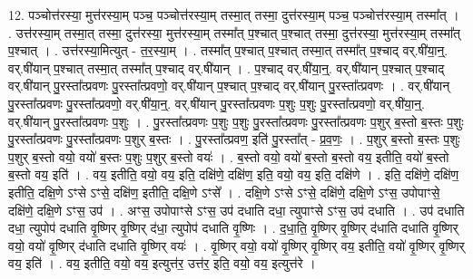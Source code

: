 \documentclass[17pt]{extarticle}
\begin{document}
12. पञ्चोत्त॑रस्या॒ मुत्त॑रस्या॒म् पञ्च॒ पञ्चोत्त॑रस्या॒म् तस्मा॒त् तस्मा॒ दुत्त॑रस्या॒म् पञ्च॒ पञ्चोत्त॑रस्या॒म् तस्मा᳚त् । . उत्त॑रस्या॒म् तस्मा॒त् तस्मा॒ दुत्त॑रस्या॒ मुत्त॑रस्या॒म् तस्मा᳚त् प॒श्चात् प॒श्चात् तस्मा॒ दुत्त॑रस्या॒ मुत्त॑रस्या॒म् तस्मा᳚त् प॒श्चात् । . उत्त॑रस्या॒मित्युत् - त॒र॒स्या॒म् । . तस्मा᳚त् प॒श्चात् प॒श्चात् तस्मा॒त् तस्मा᳚त् प॒श्चाद् वर्.षी॑या॒न्॒. वर्.षी॑यान् प॒श्चात् तस्मा॒त् तस्मा᳚त् प॒श्चाद् वर्.षी॑यान् । . प॒श्चाद् वर्.षी॑या॒न्॒. वर्.षी॑यान् प॒श्चात् प॒श्चाद् वर्.षी॑यान् पु॒रस्ता᳚त्प्रवणः पु॒रस्ता᳚त्प्रवणो॒ वर्.षी॑यान् प॒श्चात् प॒श्चाद् वर्.षी॑यान् पु॒रस्ता᳚त्प्रवणः । . वर्.षी॑यान् पु॒रस्ता᳚त्प्रवणः पु॒रस्ता᳚त्प्रवणो॒ वर्.षी॑या॒न्॒. वर्.षी॑यान् पु॒रस्ता᳚त्प्रवणः प॒शुः प॒शुः पु॒रस्ता᳚त्प्रवणो॒ वर्.षी॑या॒न्॒. वर्.षी॑यान् पु॒रस्ता᳚त्प्रवणः प॒शुः । . पु॒रस्ता᳚त्प्रवणः प॒शुः प॒शुः पु॒रस्ता᳚त्प्रवणः पु॒रस्ता᳚त्प्रवणः प॒शुर् ब॒स्तो ब॒स्तः प॒शुः पु॒रस्ता᳚त्प्रवणः पु॒रस्ता᳚त्प्रवणः प॒शुर् ब॒स्तः । . पु॒रस्ता᳚त्प्रवण॒ इति॑ पु॒रस्ता᳚त् - प्र॒व॒णः॒ । . प॒शुर् ब॒स्तो ब॒स्तः प॒शुः प॒शुर् ब॒स्तो वयो॒ वयो॑ ब॒स्तः प॒शुः प॒शुर् ब॒स्तो वयः॑ । . ब॒स्तो वयो॒ वयो॑ ब॒स्तो ब॒स्तो वय॒ इतीति॒ वयो॑ ब॒स्तो ब॒स्तो वय॒ इति॑ । . वय॒ इतीति॒ वयो॒ वय॒ इति॒ दक्षि॑णे॒ दक्षि॑ण॒ इति॒ वयो॒ वय॒ इति॒ दक्षि॑णे । . इति॒ दक्षि॑णे॒ दक्षि॑ण॒ इतीति॒ दक्षि॒णे ऽꣳसे ऽꣳसे॒ दक्षि॑ण॒ इतीति॒ दक्षि॒णे ऽꣳसे᳚ । . दक्षि॒णे ऽꣳसे ऽꣳसे॒ दक्षि॑णे॒ दक्षि॒णे ऽꣳस॒ उपोपाꣳसे॒ दक्षि॑णे॒ दक्षि॒णे ऽꣳस॒ उप॑ । . अꣳस॒ उपोपाꣳसे ऽꣳस॒ उप॑ दधाति दधा॒ त्युपाꣳसे ऽꣳस॒ उप॑ दधाति । . उप॑ दधाति दधा॒ त्युपोप॑ दधाति वृ॒ष्णिर् वृ॒ष्णिर् द॑धा॒ त्युपोप॑ दधाति वृ॒ष्णिः । . द॒धा॒ति॒ वृ॒ष्णिर् वृ॒ष्णिर् द॑धाति दधाति वृ॒ष्णिर् वयो॒ वयो॑ वृ॒ष्णिर् द॑धाति दधाति वृ॒ष्णिर् वयः॑ । . वृ॒ष्णिर् वयो॒ वयो॑ वृ॒ष्णिर् वृ॒ष्णिर् वय॒ इतीति॒ वयो॑ वृ॒ष्णिर् वृ॒ष्णिर् वय॒ इति॑ । . वय॒ इतीति॒ वयो॒ वय॒ इत्युत्त॑र॒ उत्त॑र॒ इति॒ वयो॒ वय॒ इत्युत्त॑रे । \newline
\end{document}

